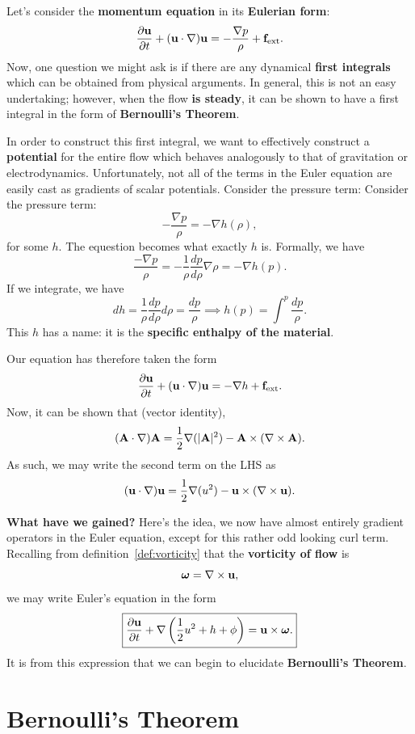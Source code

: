 Let's consider the \textbf{momentum equation} in its \textbf{Eulerian form}:
\[
\frac{\partial {\bf u}}{\partial t} + ({\bf u} \cdot \nabla){\bf u} = -\frac{\nabla p}{\rho} + {\bf f}_{\rm ext}.
\]
Now, one question we might ask is if there are any dynamical \textbf{first integrals} which can be obtained from physical arguments. In general, this is not an easy undertaking; however, when the flow \textbf{is steady}, it can be shown to have a first integral in the form of \textbf{Bernoulli's Theorem}.
\par
In order to construct this first integral, we want to effectively construct a \textbf{potential} for the entire flow which behaves analogously to that of gravitation or electrodynamics. Unfortunately, not all of the terms in the Euler equation are easily cast as gradients of scalar potentials. Consider the pressure term:
 Consider the pressure term:
\[
-\frac{\nabla p}{\rho} = -\nabla h(\rho),
\]
for some $h$. The equestion becomes what exactly $h$ is. Formally, we have
\[
\frac{-\nabla p}{\rho} = - \frac{1}{\rho}\frac{dp}{d\rho} \nabla \rho = - \nabla h(p).
\]
If we integrate, we have
\[
dh = \frac{1}{\rho} \frac{dp}{d\rho} d\rho = \frac{dp}{\rho} \implies h(p) = \int^p \frac{dp}{\rho}.
\]
This $h$ has a name: it is the \textbf{specific enthalpy of the material}. 

Our equation has therefore taken the form
\[
\frac{\partial {\bf u}}{\partial t} + ({\bf u} \cdot \nabla){\bf u}  = -\nabla h+ {\bf f}_{\rm ext}.
\]
Now, it can be shown that (vector identity),
\[
({\bf A} \cdot \nabla){\bf A} = \frac{1}{2}\nabla(|{\bf A}|^2) - {\bf A} \times (\nabla \times {\bf A}).
\]
As such, we may write the second term on the LHS as
\[
({\bf u \cdot \nabla}){\bf u}  = \frac{1}{2}\nabla(u^2) - {\bf u} \times (\nabla \times {\bf u}).
\]
\par
\textbf{What have we gained?} Here's the idea, we now have almost entirely gradient operators in the Euler equation, except for this rather odd looking curl term. Recalling from definition~\ref{def:vorticity} that
the \textbf{vorticity of flow} is
\[
\boldsymbol{\omega} = \nabla \times {\bf u},
\]
we may write Euler's equation in the form
\[
\boxed{
\frac{\partial {\bf u}}{\partial t} +\nabla\left(\frac{1}{2}u^2 + h + \phi\right) = {\bf u} \times \boldsymbol{\omega}.}
\]
It is from this expression that we can begin to elucidate \textbf{Bernoulli's Theorem}.


\section{Bernoulli's Theorem}


